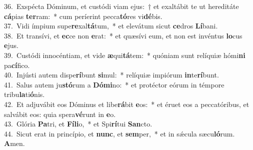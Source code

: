 {36.~}Exspécta Dóminum, et custódi viam ejus:~† et exaltábit te ut hereditáte \textbf{cá}pias \textbf{ter}ram:~* cum períerint pecca\textbf{tó}res vi\textbf{dé}bis.\\
{37.~}Vidi ímpium supe\textbf{re}xal\textbf{tá}tum,~* et elevátum sicut \textbf{ce}dros \textbf{Lí}bani.\\
{38.~}Et transívi, et \textbf{ec}ce non \textbf{e}rat:~* et quæsívi eum, et non est invéntus \textbf{lo}cus \textbf{e}jus.\\
{39.~}Custódi innocéntiam, et vide \textbf{æ}qui\textbf{tá}tem:~* quóniam sunt relíquiæ hómi\textbf{ni} pa\textbf{cí}fico.\\
{40.~}Injústi autem dispe\textbf{rí}bunt \textbf{si}mul:~* relíquiæ impiórum \textbf{in}te\textbf{rí}bunt.\\
{41.~}Salus autem ju\textbf{stó}rum a \textbf{Dó}\textbf{mi}no:~* et protéctor eórum in témpore tribu\textbf{la}ti\textbf{ó}nis.\\
{42.~}Et adjuvábit eos Dóminus et libe\textbf{rá}bit \textbf{e}os:~* et éruet eos a peccatóribus, et salvábit eos: quia spera\textbf{vé}runt in \textbf{e}o.\\
{43.~}Glória \textbf{Pa}tri, et \textbf{Fí}\textbf{li}o,~* et Spi\textbf{rí}tui \textbf{San}cto.\\
{44.~}Sicut erat in princípio, et \textbf{nunc}, et \textbf{sem}per,~* et in sǽcula sæcu\textbf{ló}rum. \textbf{A}men.\\
